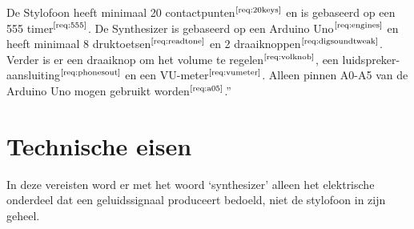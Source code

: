 \documentclass[12pt, a4paper, dutch]{article}
\newcommand{\req}[1]{$^{\text{\ref{req:#1}}}$}
\begin{document}
De Stylofoon heeft minimaal 20 contactpunten\req{20keys} en is gebaseerd op een 555
timer\req{555}. De Synthesizer is gebaseerd op een Arduino Uno\req{engines} en heeft
minimaal 8 druktoetsen\req{readtone} en 2
draaiknoppen\req{digsoundtweak}. Verder is er een draaiknop om het
volume te regelen\req{volknob}, een luidspreker-aansluiting\req{phonesout} en een
VU-meter\req{vumeter}. Alleen pinnen A0-A5 van de Arduino Uno mogen gebruikt
worden\req{a05}.''

\section{Technische eisen}

In deze vereisten word er met het woord `synthesizer' alleen het elektrische
onderdeel dat een geluidssignaal produceert bedoeld, niet de stylofoon in zijn
geheel.
\end{document}
